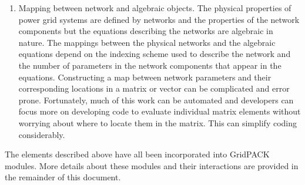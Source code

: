 \begin{enumerate}
\item  Mapping between network and algebraic objects. The physical properties of power grid systems are defined by networks and the properties of the network components but the equations describing the networks are algebraic in nature. The mappings between the physical networks and the algebraic equations depend on the indexing scheme used to describe the network and the number of parameters in the network components that appear in the equations. Constructing a map between network parameters and their corresponding locations in a matrix or vector can be complicated and error prone. Fortunately, much of this work can be automated and developers can focus more on developing code to evaluate individual matrix elements without worrying about where to locate them in the matrix. This can simplify coding considerably.
\end{enumerate}

The elements described above have all been incorporated into GridPACK modules. More details about these modules and their interactions are provided in the remainder of this document.
\newline
\hyperlink{topDoc}{\color{blue}{Top}}
